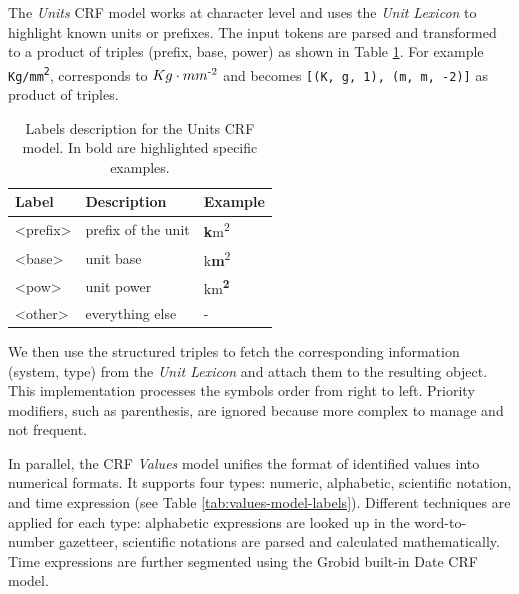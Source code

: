 \documentclass[sigconf]{acmart}
\begin{document}
The \textit{Units} CRF model works at character level and uses the \textit{Unit Lexicon} to highlight known units or prefixes. The input tokens are parsed and transformed to a product of triples (prefix, base, power) as shown in Table \ref{tab:units-model-labels}. For example \texttt{Kg/mm\textsuperscript{2}}, corresponds to \texttt{$Kg\cdot mm\textsuperscript{-2}$} and becomes \texttt{[(K, g, 1), (m, m, -2)]} as product of triples. 

\begin{table}[ht]
  \caption{Labels description for the Units CRF model. In bold are highlighted specific examples. }
  \label{tab:units-model-labels}
  \begin{tabular}{lll}
    \toprule
    Label & Description & Example\\
    \midrule
    <prefix> & prefix of the unit  & \textbf{k}m\textsuperscript{2} \\
    <base> & unit base & k\textbf{m}\textsuperscript{2}\\
    <pow> & unit power & km\textsuperscript{\textbf{2}}\\
    <other> & everything else & - \\
  \bottomrule
\end{tabular}
\end{table}

We then use the structured triples to fetch the corresponding information (system, type) from the \textit{Unit Lexicon} and attach them to the resulting object. 
This implementation processes the symbols order from right to left. Priority modifiers, such as parenthesis, are ignored because more complex to manage and not frequent. 

In parallel, the CRF \textit{Values} model unifies the format of identified values into numerical formats. It supports four types: numeric, alphabetic, scientific notation, and time expression (see Table \ref{tab:values-model-labels}). Different techniques are applied for each type: alphabetic expressions are looked up in the word-to-number gazetteer, scientific notations are parsed and calculated mathematically. Time expressions are further segmented using the Grobid built-in Date CRF model.
\end{document}
